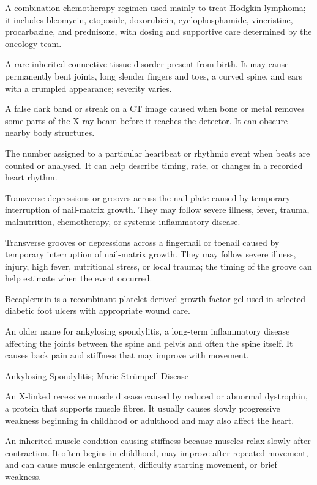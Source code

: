  A combination chemotherapy regimen used mainly to treat Hodgkin lymphoma; it includes bleomycin, etoposide, doxorubicin, cyclophosphamide, vincristine, procarbazine, and prednisone, with dosing and supportive care determined by the oncology team.

 A rare inherited connective-tissue disorder present from birth. It may cause permanently bent joints, long slender fingers and toes, a curved spine, and ears with a crumpled appearance; severity varies.

 A false dark band or streak on a CT image caused when bone or metal removes some parts of the X-ray beam before it reaches the detector. It can obscure nearby body structures.

 The number assigned to a particular heartbeat or rhythmic event when beats are counted or analysed. It can help describe timing, rate, or changes in a recorded heart rhythm.

 Transverse depressions or grooves across the nail plate caused by temporary interruption
of nail-matrix growth. They may follow severe illness, fever, trauma, malnutrition,
chemotherapy, or systemic inflammatory disease.

 Transverse grooves or depressions across a fingernail or toenail caused by temporary interruption of
nail-matrix growth. They may follow severe illness, injury, high fever, nutritional stress, or
local trauma; the timing of the groove can help estimate when the event occurred.

 Becaplermin is a recombinant platelet-derived growth factor gel used in selected diabetic foot ulcers with appropriate wound care.

 An older name for ankylosing spondylitis, a long-term inflammatory disease affecting the joints between the spine and pelvis and often the spine itself. It causes back pain and stiffness that may improve with movement.

\synonyms
Ankylosing Spondylitis; Marie-Strümpell Disease

 An X-linked recessive muscle disease caused by reduced or abnormal dystrophin, a protein that supports muscle fibres. It usually causes slowly progressive weakness beginning in childhood or adulthood and may also affect the heart.

 An inherited muscle condition causing stiffness because muscles relax slowly after contraction. It often begins in childhood, may improve after repeated movement, and can cause muscle enlargement, difficulty starting movement, or brief weakness.

